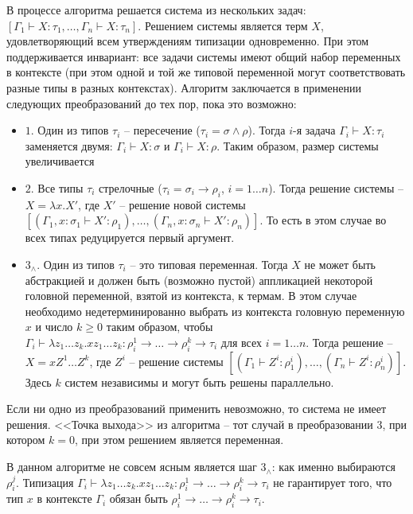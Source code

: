 \documentclass{spbau-diploma}
\begin{document}
\begin{algorithm} \label{алгоритм без эты}

В процессе алгоритма решается система из нескольких задач: $[\Gamma_1 \vdash X : \tau_1 ,\dots, \Gamma_n \vdash X : \tau_n]$. Решением системы является терм $X$, удовлетворяющий всем утверждениям типизации одновременно. При этом поддерживается инвариант: все задачи системы имеют общий набор переменных в контексте (при этом одной и той же типовой переменной могут соответствовать разные типы в разных контекстах). Алгоритм заключается в применении следующих преобразований до тех пор, пока это возможно:
\begin{itemize}
    \item $1$. Один из типов $\tau_i$ -- пересечение ($\tau_i = \sigma \wedge \rho$). Тогда $i$-я задача $\Gamma_i \vdash X : \tau_i$ заменяется двумя:  $\Gamma_i \vdash X : \sigma$ и $\Gamma_i \vdash X : \rho$. Таким образом, размер системы увеличивается
     \item $2$. Все типы $\tau_i$ стрелочные  ($\tau_i = \sigma_i \to \rho_i$, $i = 1 \dots n$). Тогда решение системы --  $X = \lambda x.X'$, где $X'$ -- решение новой системы  $[(\Gamma_1, x:\sigma_1 \vdash X' : \rho_1) ,\dots, (\Gamma_n, x:\sigma_n \vdash X' : \rho_n)]$. То есть в этом случае во всех типах редуцируется первый аргумент. 
     \item $3_{\wedge}$. Один из типов $\tau_i$ -- это типовая переменная. Тогда $X$ не может быть абстракцией и должен быть (возможно пустой) аппликацией некоторой головной переменной, взятой из контекста, к термам. В этом случае необходимо недетерминированно выбрать из контекста головную переменную $x$ и число $k \geqslant 0$ таким образом, чтобы  $\Gamma_i \vdash \lambda z_1 \dots z_k . x z_1 \dots z_k : \rho_i^1 \to \dots \to \rho_i^k \to \tau_i$ для всех $i = 1 \dots n$. Тогда решение --  $X = x Z^1 \dots Z^k$, где  $Z^i$ -- решение системы $[(\Gamma_1 \vdash Z^i : \rho_1^i) ,\dots, (\Gamma_n \vdash Z^i : \rho_n^i)]$. Здесь $k$ систем независимы и могут быть решены параллельно.
\end{itemize}

Если ни одно из преобразований применить невозможно, то система не имеет решения. 
<<Точка выхода>> из алгоритма -- тот случай в преобразовании 3, при котором $k = 0$, при этом решением является переменная.
    
\end{algorithm}


В данном алгоритме не совсем ясным является шаг $3_{\wedge}$: как именно выбираются $\rho_i^j$. Типизация $\Gamma_i \vdash \lambda z_1 \dots z_k . x z_1 \dots z_k : \rho_i^1 \to \dots \to \rho_i^k \to \tau_i$ не гарантирует того, что тип $x$ в контексте $\Gamma_i$ обязан быть $ \rho_i^1 \to \dots \to \rho_i^k \to \tau_i$.
\end{document}
